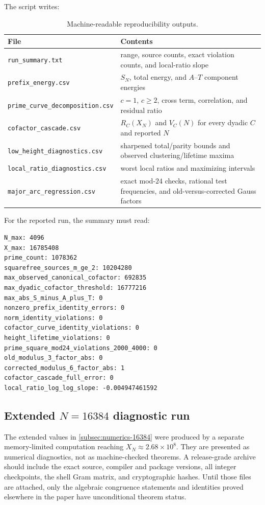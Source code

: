 \documentclass[11pt]{article}
\theoremstyle{definition}
\theoremstyle{remark}
\newcommand{\1}{\mathbf{1}}
\begin{document}
The script writes:

\begin{table}[htbp]
\centering
\caption{Machine-readable reproducibility outputs.}
\label{tab:repro-files}
\small
\begin{tabular}{lp{}}
\toprule
File & Contents\\
\midrule
\texttt{run\_summary.txt}
& range, source counts, exact violation counts, and local-ratio slope\\
\texttt{prefix\_energy.csv}
& $S_N$, total energy, and $A$--$T$ component energies\\
\texttt{prime\_curve\_decomposition.csv}
& $c=1$, $c\ge2$, cross term, correlation, and residual ratio\\
\texttt{cofactor\_cascade.csv}
& $R_C(X_N)$ and $V_C(N)$ for every dyadic $C$ and reported $N$\\
\texttt{low\_height\_diagnostics.csv}
& sharpened total/parity bounds and observed clustering/lifetime maxima\\
\texttt{local\_ratio\_diagnostics.csv}
& worst local ratios and maximizing intervals\\
\texttt{major\_arc\_regression.csv}
& exact mod-$24$ checks, rational test frequencies, and old-versus-corrected Gauss factors\\
\bottomrule
\end{tabular}
\end{table}

For the reported run, the summary must read:
\begin{verbatim}
N_max: 4096
X_max: 16785408
prime_count: 1078362
squarefree_sources_m_ge_2: 10204280
max_observed_canonical_cofactor: 692835
max_dyadic_cofactor_threshold: 16777216
max_abs_S_minus_A_plus_T: 0
nonzero_prefix_identity_errors: 0
norm_identity_violations: 0
cofactor_curve_identity_violations: 0
height_lifetime_violations: 0
prime_square_mod24_violations_2000_4000: 0
old_modulus_3_factor_abs: 0
corrected_modulus_6_factor_abs: 1
cofactor_cascade_full_error: 0
local_ratio_log_log_slope: -0.004947461592
\end{verbatim}

\subsection{\texorpdfstring{Extended $N=16384$ diagnostic run}{Extended N=16384 diagnostic run}}

The extended values in \cref{subsec:numerics-16384} were produced by a separate
memory-limited computation reaching $X_N\approx2.68\times10^8$.  They are presented
as numerical diagnostics, not as machine-checked theorems.  A release-grade archive
should include the exact source, compiler and package versions, all integer
checkpoints, the shell Gram matrix, and cryptographic hashes.  Until those files are
attached, only the algebraic congruence statements and identities proved elsewhere
in the paper have unconditional theorem status.
\end{document}
